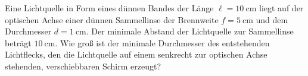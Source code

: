 \begin{Exercise}[title = Lichtband, label = band, difficulty = 3, origin = {1. Runde im Auswahlwettbewerb zur IPhO 2006}]
Eine Lichtquelle in Form eines dünnen Bandes der Länge $\ell = 10~\mathrm{cm}$ liegt auf der optischen Achse einer dünnen Sammellinse der Brennweite $f = 5~\mathrm{cm}$ und dem Durchmesser $d = 1~\mathrm{cm}$. Der minimale Abstand der Lichtquelle zur Sammellinse beträgt $10~\mathrm{cm}$. Wie groß ist der minimale Durchmesser des entstehenden Lichtflecks, den die Lichtquelle auf einem senkrecht zur optischen Achse stehenden, verschiebbaren Schirm erzeugt?
\end{Exercise}